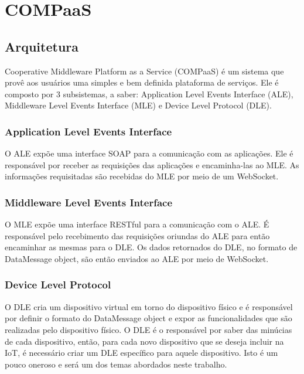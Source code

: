 \section{COMPaaS}
\label{sec:COMPaaS}
\subsection{Arquitetura}
Cooperative Middleware Platform as a Service (COMPaaS) é um sistema que provê aos usuários uma simples e bem definida plataforma de serviços.
Ele é composto por 3 subsistemas, a saber:  Application Level Events Interface (ALE), Middleware Level Events Interface (MLE) e Device Level
Protocol (DLE).
\subsubsection{Application Level Events Interface}
O ALE expõe uma interface SOAP para a comunicação com as aplicações. Ele é responsável por receber as requisições das aplicações e encaminha-las ao MLE. As informações requisitadas são recebidas do MLE por meio de um WebSocket.
\subsubsection{Middleware Level Events Interface}
O MLE expõe uma interface RESTful para a comunicação com o ALE. É responsável pelo recebimento das requisições oriundas do ALE para então encaminhar as mesmas para o DLE. Os dados retornados do DLE, no formato de DataMessage object, são então enviados ao ALE por meio de WebSocket.
\subsubsection{Device Level Protocol}
O DLE cria um dispositivo virtual em torno do dispositivo físico e é responsável por definir o formato do DataMessage object e expor as funcionalidades que são realizadas pelo dispositivo físico. O DLE é o responsável por saber das minúcias de cada dispositivo, então, para cada novo dispositivo que se deseja incluir na IoT, é necessário criar um DLE específico para aquele dispositivo. Isto é um pouco oneroso e será um dos temas abordados neste trabalho.

